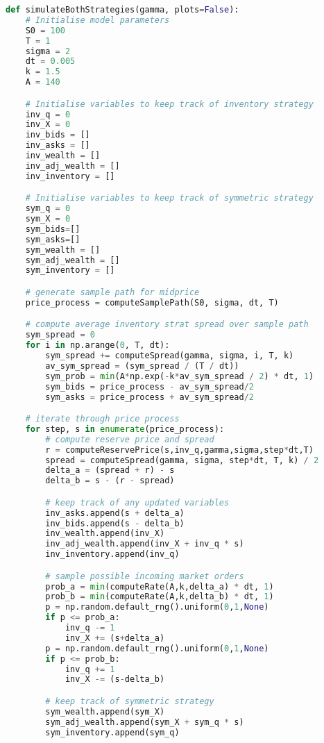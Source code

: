 \begin{lstlisting}[language=Python, caption=Avellaneda-Stoikov Model]
    def simulateBothStrategies(gamma, plots=False):
    # Initialise model parameters
    S0 = 100
    T = 1
    sigma = 2
    dt = 0.005
    k = 1.5
    A = 140

    # Initialise variables to keep track of inventory strategy
    inv_q = 0
    inv_X = 0
    inv_bids = []
    inv_asks = []
    inv_wealth = []
    inv_adj_wealth = []
    inv_inventory = []

    # Initialise variables to keep track of symmetric strategy
    sym_q = 0 
    sym_X = 0
    sym_bids=[]
    sym_asks=[]
    sym_wealth = []
    sym_adj_wealth = []
    sym_inventory = []

    # generate sample path for midprice
    price_process = computeSamplePath(S0, sigma, dt, T)

    # compute average inventory strat spread over sample path
    sym_spread = 0 
    for i in np.arange(0, T, dt):
        sym_spread += computeSpread(gamma, sigma, i, T, k)
        av_sym_spread = (sym_spread / (T / dt))
        sym_prob = min(A*np.exp(-k*av_sym_spread / 2) * dt, 1)
        sym_bids = price_process - av_sym_spread/2
        sym_asks = price_process + av_sym_spread/2

    # iterate through price process
    for step, s in enumerate(price_process):
        # compute reserve price and spread
        r = computeReservePrice(s,inv_q,gamma,sigma,step*dt,T)
        spread = computeSpread(gamma, sigma, step*dt, T, k) / 2
        delta_a = (spread + r) - s
        delta_b = s - (r - spread)

        # keep track of any updated variables
        inv_asks.append(s + delta_a)
        inv_bids.append(s - delta_b)
        inv_wealth.append(inv_X)
        inv_adj_wealth.append(inv_X + inv_q * s)
        inv_inventory.append(inv_q)

        # sample possible incoming market orders
        prob_a = min(computeRate(A,k,delta_a) * dt, 1)
        prob_b = min(computeRate(A,k,delta_b) * dt, 1)
        p = np.random.default_rng().uniform(0,1,None)
        if p <= prob_a:
            inv_q -= 1
            inv_X += (s+delta_a)
        p = np.random.default_rng().uniform(0,1,None)
        if p <= prob_b:
            inv_q += 1
            inv_X -= (s-delta_b)

        # keep track of symmetric strategy
        sym_wealth.append(sym_X) 
        sym_adj_wealth.append(sym_X + sym_q * s)
        sym_inventory.append(sym_q)


\end{lstlisting}
